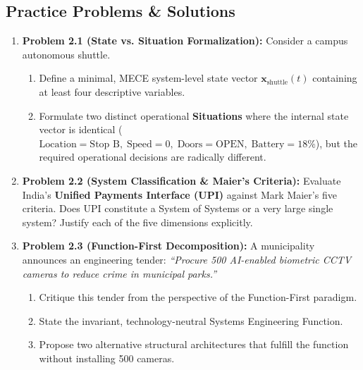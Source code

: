 \subsection{Practice Problems \& Solutions}

\begin{enumerate}[leftmargin=2em]
    \item \textbf{Problem 2.1 (State vs. Situation Formalization):}
    Consider a campus autonomous shuttle. 
    \begin{enumerate}[label=(\alph*)]
        \item Define a minimal, MECE system-level state vector $\mathbf{x}_{\text{shuttle}}(t)$ containing at least four descriptive variables.
        \item Formulate two distinct operational \textbf{Situations} where the internal state vector is identical ($\text{Location} = \text{Stop B}, \; \text{Speed} = 0, \; \text{Doors} = \text{OPEN}, \; \text{Battery} = 18\%$), but the required operational decisions are radically different.
    \end{enumerate}

    \item \textbf{Problem 2.2 (System Classification \& Maier's Criteria):}
    Evaluate India's \textbf{Unified Payments Interface (UPI)} against Mark Maier's five criteria. Does UPI constitute a System of Systems or a very large single system? Justify each of the five dimensions explicitly.

    \item \textbf{Problem 2.3 (Function-First Decomposition):}
    A municipality announces an engineering tender: \textit{``Procure 500 AI-enabled biometric CCTV cameras to reduce crime in municipal parks.''}
    \begin{enumerate}[label=(\alph*)]
        \item Critique this tender from the perspective of the Function-First paradigm.
        \item State the invariant, technology-neutral Systems Engineering Function.
        \item Propose two alternative structural architectures that fulfill the function without installing 500 cameras.
    \end{enumerate}
\end{enumerate}

